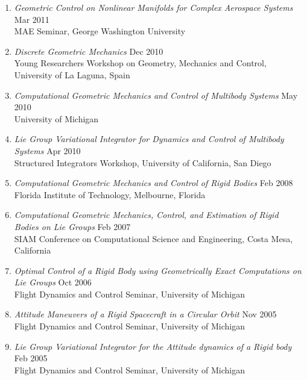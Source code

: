 \documentclass[10pt]{article}
\begin{document}
\begin{enumerate}[itemsep=2pt,parsep=2pt]
\item \textit{Geometric Control on Nonlinear Manifolds for Complex Aerospace Systems}  \hfill Mar 2011\\
    {MAE Seminar}, George Washington University

\item \textit{Discrete Geometric Mechanics}  \hfill Dec 2010\\
    {Young Researchers Workshop on Geometry, Mechanics and Control}, University of La Laguna, Spain

\item \textit{Computational Geometric Mechanics and Control of Multibody Systems}  \hfill May 2010\\
    {University of Michigan}

\item \textit{Lie Group Variational Integrator for Dynamics and Control of Multibody Systems}  \hfill Apr 2010\\
    {Structured Integrators Workshop}, University of California, San Diego

\item \textit{Computational Geometric Mechanics and Control of Rigid Bodies}  \hfill Feb 2008\\
    {Florida Institute of Technology}, Melbourne, Florida

\item \textit{Computational Geometric Mechanics, Control, and Estimation of Rigid Bodies on Lie Groups}  \hfill Feb 2007\\
    {SIAM Conference on Computational Science and Engineering}, Costa Mesa, California

\item \textit{Optimal Control of a Rigid Body using Geometrically Exact Computations on Lie Groups}  \hfill Oct 2006\\
    {Flight Dynamics and Control Seminar}, University of Michigan

\item \textit{Attitude Maneuvers of a Rigid Spacecraft in a Circular Orbit}  \hfill Nov 2005\\
    {Flight Dynamics and Control Seminar}, University of Michigan

\item \textit{Lie Group Variational Integrator for the Attitude dynamics of a Rigid body}  \hfill Feb 2005\\
    {Flight Dynamics and Control Seminar}, University of Michigan
\end{enumerate}
\end{document}
